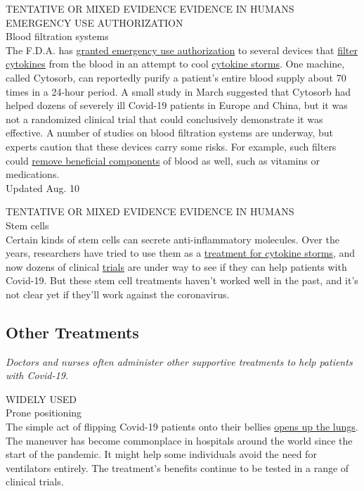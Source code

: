TENTATIVE OR MIXED EVIDENCE EVIDENCE IN HUMANS EMERGENCY USE
AUTHORIZATION\\
Blood filtration systems\\
The F.D.A. has
\href{https://www.nytimes3xbfgragh.onion/2020/08/10/health/stephen-hahn-fda.html}{granted
emergency use authorization} to several devices that
\href{https://www.nytimes3xbfgragh.onion/2020/06/11/health/coronavirus-cytokine-storm.html}{filter
cytokines} from the blood in an attempt to cool
\href{https://www.nytimes3xbfgragh.onion/2020/06/11/health/coronavirus-cytokine-storm.html}{cytokine
storms}. One machine, called Cytosorb, can reportedly purify a patient's
entire blood supply about 70 times in a 24-hour period. A small study in
March suggested that Cytosorb had helped dozens of severely ill Covid-19
patients in Europe and China, but it was not a randomized clinical trial
that could conclusively demonstrate it was effective. A number of
studies on blood filtration systems are underway, but experts caution
that these devices carry some risks. For example, such filters could
\href{https://www.fda.gov/media/136866/download}{remove beneficial
components} of blood as well, such as vitamins or medications.\\
Updated Aug. 10

TENTATIVE OR MIXED EVIDENCE EVIDENCE IN HUMANS\\
Stem cells\\
Certain kinds of stem cells can secrete anti-inflammatory molecules.
Over the years, researchers have tried to use them as a
\href{https://celltrials.org/news/role-msc-treat-coronavirus-pneumonia-and-ards-part-1-is-emperor-wearing-clothes}{treatment
for cytokine storms}, and now dozens of clinical
\href{https://clinicaltrials.gov/ct2/results?term=stem+cell\&cond=COVID-19\&age_v=\&gndr=\&type=\&rslt=\&phase=0\&phase=1\&phase=2\&phase=3\&Search=Apply}{trials}
are under way to see if they can help patients with Covid-19. But these
stem cell treatments haven't worked well in the past, and it's not clear
yet if they'll work against the coronavirus.

\hypertarget{other-treatments}{%
\subsection{Other Treatments}\label{other-treatments}}

\emph{Doctors and nurses often administer other supportive treatments to
help patients with Covid-19.}

WIDELY USED\\
Prone positioning\\
The simple act of flipping Covid-19 patients onto their bellies
\href{https://www.nytimes3xbfgragh.onion/2020/05/13/health/coronavirus-proning-lungs.html}{opens
up the lungs}. The maneuver has become commonplace in hospitals around
the world since the start of the pandemic. It might help some
individuals avoid the need for ventilators entirely. The treatment's
benefits continue to be tested in a range of clinical trials.


